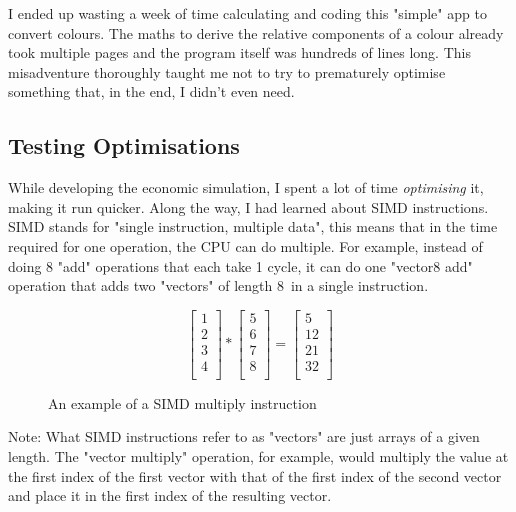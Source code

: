I ended up wasting a week of time calculating and coding this "simple" app to convert colours. The maths to derive the
relative components of a colour already took multiple pages and the program itself was hundreds of lines long. This
misadventure thoroughly taught me not to try to prematurely optimise something that, in the end, I didn't even need.

\subsection{Testing Optimisations}

While developing the economic simulation, I spent a lot of time \textit{optimising} it, making it run quicker. Along the
way, I had learned about SIMD instructions. SIMD stands for "single instruction, multiple data", this means that in the
time required for one operation, the CPU can do multiple. For example, instead of doing 8 "add" operations that each take 1
cycle, it can do one "vector8 add" operation that adds two "vectors" of length 8\ in a single instruction.

\begin{figure}[h]
	\begin{center}
		$$\begin{bmatrix}
				1 \\
				2 \\
				3 \\
				4 \\
			\end{bmatrix} *
			\begin{bmatrix}
				5 \\
				6 \\
				7 \\
				8 \\
			\end{bmatrix} =
			\begin{bmatrix}
				5  \\
				12 \\
				21 \\
				32 \\
			\end{bmatrix}$$
	\end{center}
	\caption{An example of a SIMD multiply instruction}
\end{figure}

{\small Note: What SIMD instructions refer to as
"vectors" are just arrays of a given length. The "vector multiply" operation, for example, would multiply the value at the first
index of the first vector with that of the first index of the second vector and place it in the first index of the
resulting vector.}

